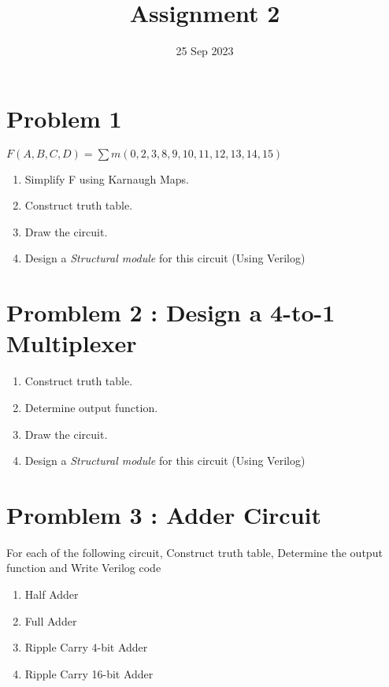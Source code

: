 \documentclass{vhdl-assignment}
\title{Assignment 2}
\date{25 Sep 2023}
\begin{document}
\maketitle

\section*{Problem 1}
$F(A,B,C,D)=\sum m(0,2,3,8,9,10,11,12,13,14,15)$
\begin{enumerate}
    \item Simplify F using Karnaugh Maps.
    \item Construct truth table.
    \item Draw the circuit.
    \item Design a \emph{Structural module} for this circuit (Using Verilog)
\end{enumerate}

\section*{Promblem 2 : Design a 4-to-1 Multiplexer }

\begin{enumerate}
    \item Construct truth table.
    \item Determine output function.
    \item Draw the circuit.
    \item Design a \emph{Structural module} for this circuit (Using Verilog)
\end{enumerate}

\section*{Promblem 3 : Adder Circuit}

For each of the following circuit, Construct truth table, Determine the output function and Write Verilog code 

\begin{enumerate}
    \item Half Adder
    \item Full Adder
    \item Ripple Carry 4-bit Adder
    \item Ripple Carry 16-bit Adder
\end{enumerate}
\end{document}
